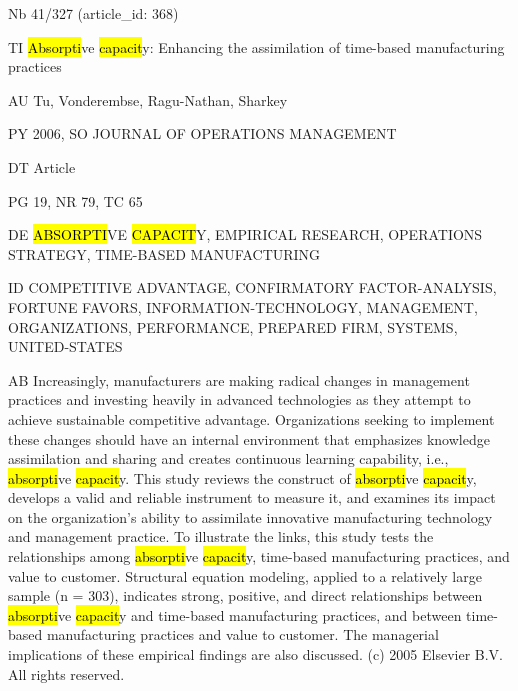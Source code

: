 \documentclass[a4paper]{article}
\begin{document}
\vspace*{-2cm}
Nb \tabto{0cm}41/327 (article\_id: 368)\par
TI \tabto{0cm}\hl{Absorpti}ve \hl{capacit}y: Enhancing the assimilation of time-based manufacturing practices\par
AU \tabto{0cm}Tu, Vonderembse, Ragu-Nathan, Sharkey\par
PY \tabto{0cm}2006, SO JOURNAL OF OPERATIONS MANAGEMENT\par
DT \tabto{0cm}Article\par
PG \tabto{0cm}19, NR 79, TC 65\par
DE \tabto{0cm}\hl{ABSORPTI}VE \hl{CAPACIT}Y, EMPIRICAL RESEARCH, OPERATIONS STRATEGY, TIME-BASED MANUFACTURING\par
ID \tabto{0cm}COMPETITIVE ADVANTAGE, CONFIRMATORY FACTOR-ANALYSIS, FORTUNE FAVORS, INFORMATION-TECHNOLOGY, MANAGEMENT, ORGANIZATIONS, PERFORMANCE, PREPARED FIRM, SYSTEMS, UNITED-STATES\par
AB \tabto{0cm}Increasingly, manufacturers are making radical changes in management practices and investing heavily in advanced technologies as they attempt to achieve sustainable competitive advantage. Organizations seeking to implement these changes should have an internal environment that emphasizes knowledge assimilation and sharing and creates continuous learning capability, i.e., \hl{absorpti}ve \hl{capacit}y. This study reviews the construct of \hl{absorpti}ve \hl{capacit}y, develops a valid and reliable instrument to measure it, and examines its impact on the organization's ability to assimilate innovative manufacturing technology and management practice. To illustrate the links, this study tests the relationships among \hl{absorpti}ve \hl{capacit}y, time-based manufacturing practices, and value to customer. Structural equation modeling, applied to a relatively large sample (n = 303), indicates strong, positive, and direct relationships between \hl{absorpti}ve \hl{capacit}y and time-based manufacturing practices, and between time-based manufacturing practices and value to customer. The managerial implications of these empirical findings are also discussed. (c) 2005 Elsevier B.V. All rights reserved.\par
\clearpage
\end{document}
